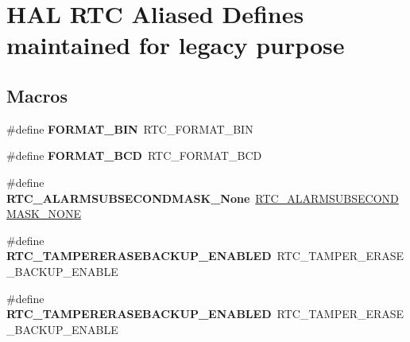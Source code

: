 \hypertarget{group___h_a_l___r_t_c___aliased___defines}{}\section{H\+AL R\+TC Aliased Defines maintained for legacy purpose}
\label{group___h_a_l___r_t_c___aliased___defines}
\subsection*{Macros}
\begin{DoxyCompactItemize}
\item 
\mbox{\label{group___h_a_l___r_t_c___aliased___defines_ga1adf0882a1368a3cef0edc34dcf8d34e}} 
\#define {\bfseries F\+O\+R\+M\+A\+T\+\_\+\+B\+IN}~R\+T\+C\+\_\+\+F\+O\+R\+M\+A\+T\+\_\+\+B\+IN
\item 
\mbox{\label{group___h_a_l___r_t_c___aliased___defines_ga950fc88b539cc9a8cf66aab2ee860fe1}} 
\#define {\bfseries F\+O\+R\+M\+A\+T\+\_\+\+B\+CD}~R\+T\+C\+\_\+\+F\+O\+R\+M\+A\+T\+\_\+\+B\+CD
\item 
\mbox{\label{group___h_a_l___r_t_c___aliased___defines_ga242adf20d2422fd1ae7715b8acd82623}} 
\#define {\bfseries R\+T\+C\+\_\+\+A\+L\+A\+R\+M\+S\+U\+B\+S\+E\+C\+O\+N\+D\+M\+A\+S\+K\+\_\+\+None}~\hyperlink{group___r_t_c___alarm___sub___seconds___masks___definitions_ga2c3802d48626766a3fc85ad910caea02}{R\+T\+C\+\_\+\+A\+L\+A\+R\+M\+S\+U\+B\+S\+E\+C\+O\+N\+D\+M\+A\+S\+K\+\_\+\+N\+O\+NE}
\item 
\mbox{\label{group___h_a_l___r_t_c___aliased___defines_ga4a78a492baabe7132ddfcf94cf7805c0}} 
\#define {\bfseries R\+T\+C\+\_\+\+T\+A\+M\+P\+E\+R\+E\+R\+A\+S\+E\+B\+A\+C\+K\+U\+P\+\_\+\+E\+N\+A\+B\+L\+ED}~R\+T\+C\+\_\+\+T\+A\+M\+P\+E\+R\+\_\+\+E\+R\+A\+S\+E\+\_\+\+B\+A\+C\+K\+U\+P\+\_\+\+E\+N\+A\+B\+LE
\item 
\mbox{\label{group___h_a_l___r_t_c___aliased___defines_ga4a78a492baabe7132ddfcf94cf7805c0}} 
\#define {\bfseries R\+T\+C\+\_\+\+T\+A\+M\+P\+E\+R\+E\+R\+A\+S\+E\+B\+A\+C\+K\+U\+P\+\_\+\+E\+N\+A\+B\+L\+ED}~R\+T\+C\+\_\+\+T\+A\+M\+P\+E\+R\+\_\+\+E\+R\+A\+S\+E\+\_\+\+B\+A\+C\+K\+U\+P\+\_\+\+E\+N\+A\+B\+LE

\end{DoxyCompactItemize}
